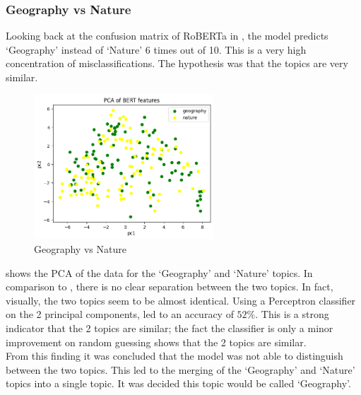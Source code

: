 \subsubsection{Geography vs Nature}
Looking back at the confusion matrix of RoBERTa in , the model predicts `Geography' instead of
`Nature' 6 times out of 10. This is a very high concentration of misclassifications. The hypothesis was that the topics are very similar.
\begin{figure}[hbtp]
    \centering
    \includegraphics[width=0.6\textwidth]{../images/geography-vs-nature.png}
    \caption{Geography vs Nature}
    \label{fig:geography-vs-nature}
\end{figure}

 shows the PCA of the data for the `Geography' and `Nature' topics. In comparison to , there is
no clear separation between the two topics. In fact, visually, the two topics seem to be almost identical. Using a Perceptron classifier
on the 2 principal components, led to an accuracy of $52\%$. This is a strong indicator that the 2 topics are similar; the fact the classifier
is only a minor improvement on random guessing shows that the 2 topics are similar.\\
From this finding it was concluded that the model was not able to distinguish between the two topics. This led to the merging of the
`Geography' and `Nature' topics into a single topic. It was decided this topic would be called `Geography'.
